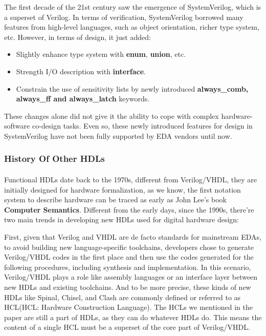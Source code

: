 \documentclass{article}
\begin{document}
The first decade of the 21st century saw the emergence of SystemVerilog, which is a superset of Verilog. In terms of verification, SystemVerilog borrowed many features from high-level languages, such as object orientation, richer type system, etc. However, in terms of design, it just added:
\begin{itemize}
\item Slightly enhance type system with \textbf{enum}, \textbf{union}, etc.
\item Strength I/O description with \textbf{interface}.
\item Constrain the use of sensitivity lists by newly introduced \textbf{always_comb, always_ff and always_latch} keywords.

\end{itemize}

These changes alone did not give it the ability to cope with complex hardware-software co-design tasks. Even so,  these newly introduced features for design in SystemVerilog have not been fully supported by EDA vendors until now.

\subsubsection{History Of Other HDLs}
\paragraph{}
Functional HDLs date back to the 1970s, different from Verilog/VHDL, they are initially designed for hardware formalization, as we know, the first notation system to describe hardware can be traced as early as John Lee’s book \textbf{Computer Semantics}. Different from the early days, since the 1990s, there’re two main trends in developing new HDLs used for digital hardware design: 

First, given that Verilog and VHDL are de facto standards for mainstream EDAs, to avoid building new language-specific toolchains, developers chose to generate Verilog/VHDL codes in the first place and then use the codes generated for the following procedures, including synthesis and implementation. In this scenario, Verilog/VHDL plays a role like assembly languages or an interface layer between new HDLs and existing toolchains. And to be more precise, these kinds of new HDLs like Spinal, Chisel, and Clash are commonly defined or referred to as HCL(HCL: Hardware Construction Language). The HCLs we mentioned in the paper are still a part of HDLs, as they can do whatever HDLs do. This means the content of a single HCL must be a superset of the core part of Verilog/VHDL.
\end{document}
